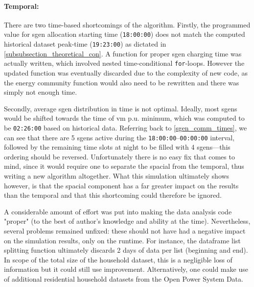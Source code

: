 \documentclass[a4paper,10pt]{report}
\begin{document}
\paragraph{Temporal:} There are two time-based shortcomings of the algorithm. Firstly, the programmed value for sgen allocation starting time (\texttt{18:00:00}) does not match the computed historical dataset peak-time (\texttt{19:23:00}) as dictated in \cref{subsubsection_theoretical_con}. A function for proper sgen charging time was actually written, which involved nested time-conditional \texttt{for}-loops. However the updated function was eventually discarded due to the complexity of new code, as the energy community function would also need to be rewritten and there was simply not enough time.

Secondly, average sgen distribution in time is not optimal. Ideally, most sgens would be shifted towards the time of vm p.u. minimum, which was computed to be \texttt{02:26:00} based on historical data. Referring back to \cref{sgen_comm_times}, we can see that there are 5 sgens active during the \texttt{18:00:00}--\texttt{00:00:00} interval, followed by the remaining time slots at night to be filled with 4 sgens---this ordering should be reversed. Unfortunately there is no easy fix that comes to mind, since it would require one to separate the spacial from the temporal, thus writing a new algorithm altogether. What this simulation ultimately shows however, is that the spacial component has a far greater impact on the results than the temporal and that this shortcoming could therefore be ignored.

A considerable amount of effort was put into making the data analysis code "proper" (to the best of author's knowledge and ability at the time). Nevertheless, several problems remained unfixed: these should not have had a negative impact on the simulation results, only on the runtime. For instance, the dataframe list splitting function ultimately discards 2 days of data per list (beginning and end). In scope of the total size of the household dataset, this is a negligible loss of information but it could still use improvement. Alternatively, one could make use of additional residential household datasets from the Open Power System Data.
\end{document}
